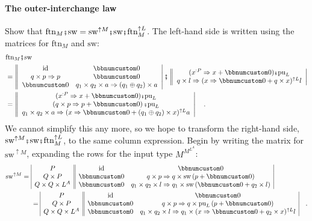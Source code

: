 \paragraph{The outer-interchange law}

Show that $\text{ftn}_{M}\bef\text{sw}=\text{sw}^{\uparrow M}\bef\text{sw}\bef\text{ftn}_{M}^{\uparrow L}$.
The left-hand side is written using the matrices for $\text{ftn}_{M}$
and $\text{sw}$:
\begin{align}
 & \text{ftn}_{M}\bef\text{sw}\nonumber \\
 & =\left\Vert \begin{array}{cc}
\text{id} & \bbnum 0\\
q\times p\Rightarrow p & \bbnum 0\\
\bbnum 0 & q_{1}\times q_{2}\times a\Rightarrow\left(q_{1}\oplus q_{2}\right)\times a
\end{array}\right|\bef\left\Vert \begin{array}{c}
(x^{:P}\Rightarrow x+\bbnum 0)\bef\text{pu}_{L}\\
q\times l\Rightarrow(x\Rightarrow\bbnum 0+q\times x)^{\uparrow L}l
\end{array}\right|\nonumber \\
 & =\left\Vert \begin{array}{c}
(x^{:P}\Rightarrow x+\bbnum 0)\bef\text{pu}_{L}\\
\left(q\times p\Rightarrow p+\bbnum 0\right)\bef\text{pu}_{L}\\
q_{1}\times q_{2}\times a\Rightarrow(x\Rightarrow\bbnum 0+\left(q_{1}\oplus q_{2}\right)\times x)^{\uparrow L}a
\end{array}\right|\quad.\label{eq:m-interchange-law-of-swap-linear-monads-left-hand-side}
\end{align}
We cannot simplify this any more, so we hope to transform the right-hand
side, $\text{sw}^{\uparrow M}\bef\text{sw}\bef\text{ftn}_{M}^{\uparrow L}$,
to the same column expression. Begin by writing the matrix for $\text{sw}^{\uparrow M}$,
expanding the rows for the input type $M^{M^{L^{A}}}$:
\begin{align*}
\text{sw}^{\uparrow M}=~ & \begin{array}{|c||cc|}
P & \text{id} & \bbnum 0\\
Q\times P & \bbnum 0 & q\times p\Rightarrow q\times\text{sw}\left(p+\bbnum 0\right)\\
Q\times Q\times L^{A} & \bbnum 0 & q_{1}\times q_{2}\times l\Rightarrow q_{1}\times\text{sw}\left(\bbnum 0+q_{2}\times l\right)
\end{array}\\
 & =\begin{array}{|c||cc|}
P & \text{id} & \bbnum 0\\
Q\times P & \bbnum 0 & q\times p\Rightarrow q\times\text{pu}_{L}\left(p+\bbnum 0\right)\\
Q\times Q\times L^{A} & \bbnum 0 & q_{1}\times q_{2}\times l\Rightarrow q_{1}\times(x\Rightarrow\bbnum 0+q_{2}\times x)^{\uparrow L}l
\end{array}\quad.
\end{align*}

